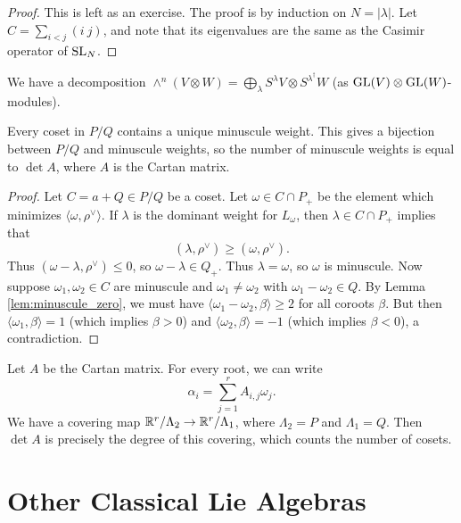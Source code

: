 \begin{proof}
  This is left as an exercise.
  The proof is by induction on
  $N = |\lambda|$. Let
  $C = \sum_{i < j} (i\ j)$, and note
  that its eigenvalues are the
  same as the Casimir operator
  of $\operatorname{SL}_N$.
\end{proof}

\begin{prop}
  We have a decomposition
  $\wedge^n(V \otimes W) = \bigoplus_\lambda S^\lambda V \otimes S^{\lambda^\dagger} W$
  (as $\operatorname{GL}(V) \otimes \operatorname{GL}(W)$-modules).
\end{prop}

\begin{prop}
  Every coset in $P / Q$ contains a
  unique minuscule weight. This gives
  a bijection between $P / Q$ and
  minuscule weights, so the
  number of minuscule weights is
  equal to $\det A$, where $A$ is the
  Cartan matrix.
\end{prop}

\begin{proof}
  Let $C = a + Q \in P / Q$ be a coset.
  Let $\omega \in C \cap P_+$ be the
  element which minimizes
  $\langle \omega, \rho^\vee \rangle$.
  If $\lambda$ is the dominant weight
  for $L_\omega$, then
  $\lambda \in C \cap P_+$ implies
  that
  \[
    (\lambda, \rho^\vee) \ge (\omega, \rho^\vee).
  \]
  Thus $(\omega - \lambda, \rho^\vee) \le 0$, so
  $\omega - \lambda \in Q_+$. Thus
  $\lambda = \omega$, so $\omega$ is
  minuscule. Now suppose $\omega_1, \omega_2 \in C$
  are minuscule and $\omega_1 \ne \omega_2$
  with $\omega_1 - \omega_2 \in Q$.
  By Lemma \ref{lem:minuscule_zero},
  we must have
  $\langle \omega_1 - \omega_2, \beta \rangle \ge 2$
  for all coroots $\beta$. But then
  $\langle \omega_1, \beta \rangle = 1$
  (which implies $\beta > 0$)
  and $\langle \omega_2, \beta \rangle = -1$
  (which implies $\beta < 0$), a
  contradiction.
\end{proof}

\begin{remark}
  Let $A$ be the Cartan matrix.
  For every root, we can write
  \[
    \alpha_i = \sum_{j = 1}^r A_{i, j} \omega_j.
  \]
  We have a covering map
  $\mathbb{R}^r / \Lambda_2 \to \mathbb{R}^r / \Lambda_1$,
  where $\Lambda_2 = P$ and
  $\Lambda_1 = Q$. Then
  $\det A$ is precisely
  the degree of this covering, which
  counts the number of cosets.
\end{remark}

\section{Other Classical Lie Algebras}

